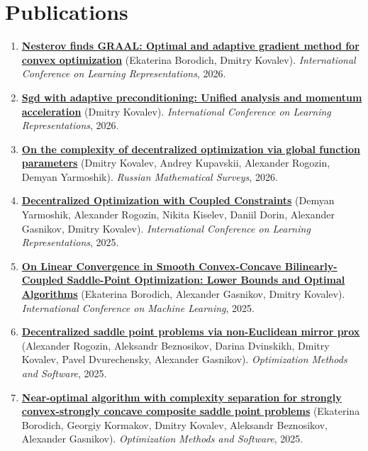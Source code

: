 \section{Publications}
\begin{enumerate}
\item
\textbf{\href{https://proceedings.iclr.cc/paper_files/paper/2026/hash/9a419ce12db8db2e35ee68c1f58c1a36-Abstract-Conference.html}{Nesterov finds GRAAL: Optimal and adaptive gradient method for convex optimization}} (Ekaterina Borodich, Dmitry Kovalev). \textit{International Conference on Learning Representations}, 2026.
\item
\textbf{\href{https://proceedings.iclr.cc/paper_files/paper/2026/hash/928170bcb050fe64a63fe781b82265aa-Abstract-Conference.html}{Sgd with adaptive preconditioning: Unified analysis and momentum acceleration}} (Dmitry Kovalev). \textit{International Conference on Learning Representations}, 2026.
\item
\textbf{\href{https://www.mathnet.ru/eng/rm10278}{On the complexity of decentralized optimization via global function parameters}} (Dmitry Kovalev, Andrey Kupavskii, Alexander Rogozin, Demyan Yarmoshik). \textit{Russian Mathematical Surveys}, 2026.
\item
\textbf{\href{https://proceedings.iclr.cc/paper_files/paper/2025/hash/9ecca44ee9150cfe350bcb3660d18c98-Abstract-Conference.html}{Decentralized Optimization with Coupled Constraints}} (Demyan Yarmoshik, Alexander Rogozin, Nikita Kiselev, Daniil Dorin, Alexander Gasnikov, Dmitry Kovalev). \textit{International Conference on Learning Representations}, 2025.
\item
\textbf{\href{https://proceedings.mlr.press/v267/borodich25a.html}{On Linear Convergence in Smooth Convex-Concave Bilinearly-Coupled Saddle-Point Optimization: Lower Bounds and Optimal Algorithms}} (Ekaterina Borodich, Alexander Gasnikov, Dmitry Kovalev). \textit{International Conference on Machine Learning}, 2025.
\item
\textbf{\href{https://www.tandfonline.com/doi/abs/10.1080/10556788.2023.2280062}{Decentralized saddle point problems via non-Euclidean mirror prox}} (Alexander Rogozin, Aleksandr Beznosikov, Darina Dvinskikh, Dmitry Kovalev, Pavel Dvurechensky, Alexander Gasnikov). \textit{Optimization Methods and Software}, 2025.
\item
\textbf{\href{https://www.tandfonline.com/doi/abs/10.1080/10556788.2025.2545846}{Near-optimal algorithm with complexity separation for strongly convex-strongly concave composite saddle point problems}} (Ekaterina Borodich, Georgiy Kormakov, Dmitry Kovalev, Aleksandr Beznosikov, Alexander Gasnikov). \textit{Optimization Methods and Software}, 2025.

\end{enumerate}
